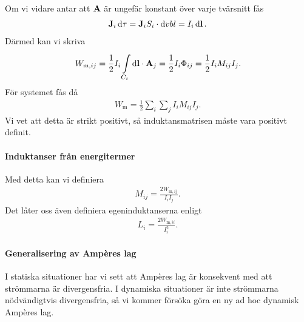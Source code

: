 Om vi vidare antar att $\vb{A}$ är ungefär konstant över varje tvärsnitt fås
\begin{align*}
	\vb{J}_{i}\dd{\tau} = \vb{J}_{i}S_{i}\cdot\dd{vb{l}} = I_{i}\dd{\vb{l}}.
\end{align*}
Därmed kan vi skriva
\begin{align*}
	W_{\text{m}, ij} = \frac{1}{2}I_{i}\int\limits_{C_{i}}^{}\dd{\vb{l}}\cdot \vb{A}_{j} = \frac{1}{2}I_{i}\Phi_{ij} = \frac{1}{2}I_{i}M_{ij}I_{j}.
\end{align*}
För systemet fås då
\begin{align*}
	W_{\text{m}} = \frac{1}{2}\sum\limits_{i}\sum\limits_{j}I_{i}M_{ij}I_{j}.
\end{align*}
Vi vet att detta är strikt positivt, så induktansmatrisen måste vara positivt definit.

\paragraph{Induktanser från energitermer}
Med detta kan vi definiera
\begin{align*}
	M_{ij} = \frac{2W_{\text{m}, ij}}{I_{i}I_{j}}.
\end{align*}
Det låter oss även definiera egeninduktanserna enligt
\begin{align*}
	L_{i} = \frac{2W_{\text{m}, ii}}{I_{i}^{2}}.
\end{align*}

\paragraph{Generalisering av Ampères lag}
I statiska situationer har vi sett att Ampères lag är konsekvent med att strömmarna är divergensfria. I dynamiska situationer är inte strömmarna nödvändigtvis divergensfria, så vi kommer försöka göra en ny ad hoc dynamisk Ampères lag.

